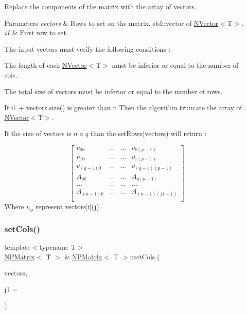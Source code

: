 Replace the components of the matrix with the array of vectors. 


\begin{DoxyParams}{Parameters}
{\em vectors} & Rows to set on the matrix. {\ttfamily std\+::vector} of {\ttfamily \mbox{\hyperlink{class_n_vector}{N\+Vector}}$<$T$>$}.\\
\hline
{\em i1} & First row to set.\\
\hline
\end{DoxyParams}
The input {\ttfamily vectors} must verify the following conditions \+:
\begin{DoxyItemize}
\item The length of each {\ttfamily \mbox{\hyperlink{class_n_vector}{N\+Vector}}$<$T$>$} must be inferior or equal to the number of cols.
\item The total size of vectors must be inferior or equal to the number of rows.
\end{DoxyItemize}

If {\ttfamily i1 + vectors.\+size()} is greater than {\ttfamily n} Then the algorithm truncate the array of {\ttfamily \mbox{\hyperlink{class_n_vector}{N\+Vector}}$<$T$>$}.

If the size of {\ttfamily vectors} is $ n \times q $ than the {\ttfamily set\+Rows(vectors)} will return \+:

\[ \begin{bmatrix} v_{00} & ... & ... & v_{0(p-1)} \\ v_{10} & ... & ... & v_{1(p-1)} \\ v_{(q-1)0} & ... & ... & v_{(q-1)(p-1)} \\ A_{q0} & ... & ... & A_{q(p-1)} \\ ... & ... & ... & ... \\ A_{(n-1)0} & ... & ... & A_{(n-1)(j1 - 1)} \\ \end{bmatrix} \] Where $ v_{ij} $ represent {\ttfamily vectors\mbox{[}i\mbox{]}(j)}. \mbox{\label{class_n_p_matrix_a16109b850d3e267e30883ddcf8d88928}} 
\subsubsection{\texorpdfstring{setCols()}{setCols()}}
{\footnotesize\ttfamily template$<$typename T$>$ \\
\mbox{\hyperlink{class_n_p_matrix}{N\+P\+Matrix}}$<$ T $>$ \& \mbox{\hyperlink{class_n_p_matrix}{N\+P\+Matrix}}$<$ T $>$\+::set\+Cols (\begin{DoxyParamCaption}\item[{const std\+::vector$<$ \mbox{\hyperlink{class_n_vector}{N\+Vector}}$<$ T $>$ $>$ \&}]{vectors,  }\item[{\mbox{\hyperlink{typedef_8h_a1b140a2034db3f5dfe18a987745df43a}{ul\+\_\+t}}}]{j1 = {} }\end{DoxyParamCaption})}



